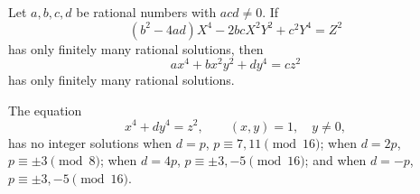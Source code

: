 \begin{proposition}
    Let $a,b,c,d$ be rational numbers with $acd\ne0$. If
\[
    (b^2-4ad)X^4-2bcX^2Y^2+c^2Y^4=Z^2
\]
    has only finitely many rational solutions, then
\[
    ax^4+bx^2y^2+dy^4=cz^2
\]
    has only finitely many rational solutions.
\end{proposition}

\begin{proposition}
    The equation
\[
    x^4+dy^4=z^2,\qquad (x,y)=1,\quad y\ne0,
\]
    has no integer solutions when $d=p$, $p\equiv7,11\pmod{16}$; when $d=2p$, $p\equiv\pm3\pmod8$; when $d=4p$, $p\equiv\pm3,-5\pmod{16}$; and when $d=-p$, $p\equiv\pm3,-5\pmod{16}$.
\end{proposition}
